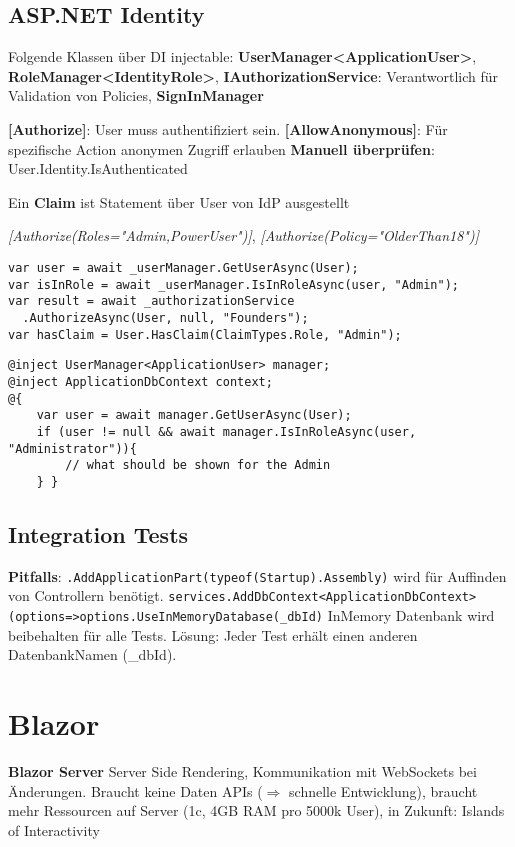 \begin{multicols*}{2}
\subsection{ASP.NET Identity}
Folgende Klassen über DI injectable: \textbf{UserManager<ApplicationUser>}, \textbf{RoleManager<IdentityRole>}, \textbf{IAuthorizationService}: Verantwortlich für Validation von Policies, \textbf{SignInManager}

\textbf{[Authorize]}: User muss authentifiziert sein. \textbf{[AllowAnonymous]}: Für spezifische Action anonymen Zugriff erlauben
\textbf{Manuell überprüfen}: User.Identity.IsAuthenticated

Ein \textbf{Claim} ist Statement über User von IdP ausgestellt

\textit{[Authorize(Roles="Admin,PowerUser")]}, \textit{[Authorize(Policy="OlderThan18")]}

\begin{verbatim}
var user = await _userManager.GetUserAsync(User);
var isInRole = await _userManager.IsInRoleAsync(user, "Admin");
var result = await _authorizationService
  .AuthorizeAsync(User, null, "Founders");
var hasClaim = User.HasClaim(ClaimTypes.Role, "Admin");
\end{verbatim}
\begin{lstlisting}
@inject UserManager<ApplicationUser> manager;
@inject ApplicationDbContext context;
@{
    var user = await manager.GetUserAsync(User);
    if (user != null && await manager.IsInRoleAsync(user, "Administrator")){
        // what should be shown for the Admin
    } }
\end{lstlisting}

\subsection{Integration Tests}
\textbf{Pitfalls}: \lstinline|.AddApplicationPart(typeof(Startup).Assembly)| wird für Auffinden von Controllern benötigt.
\lstinline|services.AddDbContext<ApplicationDbContext>(options=>options.UseInMemoryDatabase(_dbId)|
InMemory Datenbank wird beibehalten für alle Tests. Lösung: Jeder Test erhält einen anderen DatenbankNamen (\_dbId).

\section{Blazor}
\textbf{Blazor Server} Server Side Rendering, Kommunikation mit WebSockets bei Änderungen. Braucht keine Daten APIs (\(\Rightarrow\) schnelle Entwicklung), braucht mehr Ressourcen auf Server (1c, 4GB RAM pro 5000k User), in Zukunft: Islands of Interactivity


\end{multicols*}
